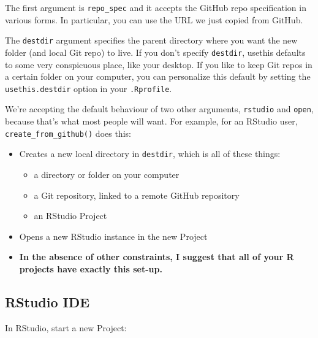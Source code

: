 \documentclass[
]{book}
\providecommand{\tightlist}{%
  \setlength{\itemsep}{0pt}\setlength{\parskip}{0pt}}
\begin{document}
The first argument is \texttt{repo\_spec} and it accepts the GitHub repo specification in various forms.
In particular, you can use the URL we just copied from GitHub.

The \texttt{destdir} argument specifies the parent directory where you want the new folder (and local Git repo) to live.
If you don't specify \texttt{destdir}, usethis defaults to some very conspicuous place, like your desktop.
If you like to keep Git repos in a certain folder on your computer, you can personalize this default by setting the \texttt{usethis.destdir} option in your \texttt{.Rprofile}.

We're accepting the default behaviour of two other arguments, \texttt{rstudio} and \texttt{open}, because that's what most people will want.
For example, for an RStudio user, \texttt{create\_from\_github()} does this:

\begin{itemize}
\tightlist
\item
  Creates a new local directory in \texttt{destdir}, which is all of these things:

  \begin{itemize}
  \tightlist
  \item
    a directory or folder on your computer
  \item
    a Git repository, linked to a remote GitHub repository
  \item
    an RStudio Project
  \end{itemize}
\item
  Opens a new RStudio instance in the new Project
\item
  \textbf{In the absence of other constraints, I suggest that all of your R projects have exactly this set-up.}
\end{itemize}

\subsection{RStudio IDE}\label{rstudio-ide}

In RStudio, start a new Project:
\end{document}
